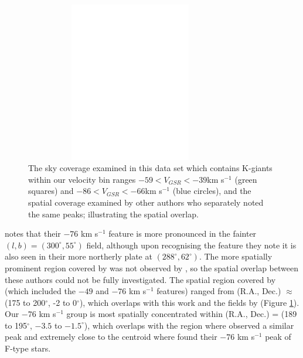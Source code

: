\documentclass{emulateapj}
\begin{document}
	\begin{figure}[h!]
		\centering
		\includegraphics[width=9.2cm,height=7cm]{./figures/blank.eps}
		\caption{The sky coverage examined in this data set which contains K-giants within our velocity bin ranges $-59 < V_{GSR} < -39 $km s$^{-1}$ (green squares) and $-86 < V_{GSR} < -66 $km s$^{-1}$ (blue circles), and the spatial coverage examined by other authors \citep{Duffau;et-al_2006, Newberg;et-al_2007} who separately noted the same peaks; illustrating the spatial overlap.}
		\label{fig:newberg-duffau-vivas-spatial}
	\end{figure}
			
		
	\citet{Newberg;et-al_2007} notes that their $-76$ km s$^{-1}$ feature is more pronounced in the fainter $(l, b) = (300^\circ, 55^\circ)$ field, although upon recognising the feature they note it is also seen in their more northerly plate at $(288^\circ, 62^\circ)$. The more spatially prominent region covered by \citet{Newberg;et-al_2007} was not observed by \citet{Vivas;et-al_2008}, so the spatial overlap between these authors could not be fully investigated. The spatial region covered by \citet{Duffau;et-al_2006} (which included the $-49$ and $-76$ km s$^{-1}$ features) ranged from (R.A., Dec.) $\approx$ (175 to 200$^\circ$, -2 to 0$^\circ$), which overlaps with this work and the fields by \citet{Newberg;et-al_2007} (Figure \ref{fig:newberg-duffau-vivas-spatial}). Our $-76$ km s$^{-1}$ group is most spatially concentrated within (R.A., Dec.) = (189 to 195$^\circ$, $-3.5$ to $-1.5^\circ$), which overlaps with the region where \citet{Duffau;et-al_2006} observed a similar peak and extremely close to the centroid where \citet{Newberg;et-al_2007} found their $-76$ km s$^{-1}$ peak of F-type stars.
			
\end{document}
